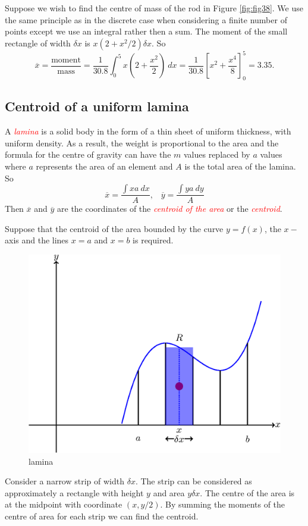 \documentclass[
  11pt,
  oneside]{book}
\newcommand{\slide}{}
\theoremstyle{definition}
\theoremstyle{definition}
\theoremstyle{definition}
\theoremstyle{definition}
\theoremstyle{remark}
\begin{document}
\slide

Suppose we wish to find the centre of mass of the rod in Figure \ref{fig:fig38}. We use the same principle as in the discrete case when considering a finite number of points except we use an integral rather then a sum. The moment of the small rectangle of width \(\delta x\) is \(x(2+x^2/2)\delta x\). So
\[
\overline x = \frac{\text{moment}}{\text{mass}} = \frac{1}{30.8}\int_0^5 x(2+\frac{x^2}{2})\ dx = \frac{1}{30.8}\left[x^2+\frac{x^4}{8}\right]_0^5 = 3.35.
\]
\slide

\subsection{Centroid of a uniform lamina}\label{centroid-of-a-uniform-lamina}

A \textcolor{red}{\em lamina} is a solid body in the form of a thin sheet of uniform thickness, with uniform density. As a result, the weight is proportional to the area and the formula for the centre of gravity can have the \(m\) values replaced by \(a\) values where \(a\) represents the area of an element and \(A\) is the total area of the lamina. So
\[
\overline x = \frac{\displaystyle\int xa\ dx}{A},\;\;\; \overline y = \frac{\displaystyle\int ya\ dy}{A}
\]
Then \(\overline x\) and \(\overline y\) are the coordinates of the \textcolor{red}{\em centroid of the area} or the \textcolor{red}{\em centroid}.

\slide

Suppose that the centroid of the area bounded by the curve \(y=f(x)\), the \(x-\)axis and the lines \(x=a\) and \(x=b\) is required.

\begin{figure}

{\centering \includegraphics[width=0.4\linewidth]{tikztopng-figure39} 

}

\caption{lamina}\label{fig:fig39}
\end{figure}

Consider a narrow strip of width \(\delta x\). The strip can be considered as approximately a rectangle with height \(y\) and area \(y\delta x\). The centre of the area is at the midpoint with coordinate \((x,y/2)\). By summing the moments of the centre of area for each strip we can find the centroid.
\end{document}
